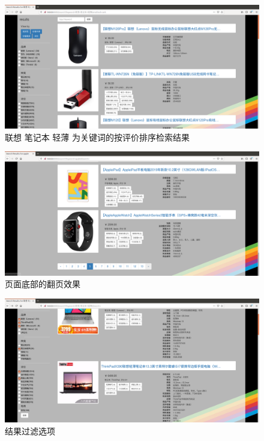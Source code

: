 \begin{figure}[htbp]
\centering
\includegraphics[width=13.5cm]{img/zlt/high_rank.png}
\caption{联想 笔记本 轻薄 为关键词的按评价排序检索结果}
\label{fig:zlt_high_rank}
\end{figure}

\begin{figure}[htbp]
\centering
\includegraphics[width=13.5cm]{img/zlt/leafflip.png}
\caption{页面底部的翻页效果}
\label{fig:zlt_leaf_flip}
\end{figure}

\begin{figure}[htbp]
\centering
\includegraphics[width=13.5cm]{img/zlt/filter1.png}
\caption{结果过滤选项}
\label{fig:zlt_filter1}
\end{figure}

